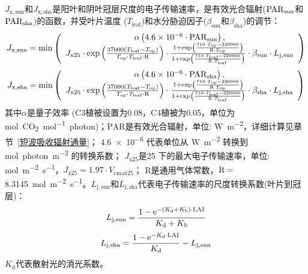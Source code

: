 $J_{\mathrm{x,sun}}$和$J_{\mathrm{x,sha}}$是阳叶和阴叶冠层尺度的电子传输速率，是有效光合辐射(${\rm PAR}_{\mathrm{sun}}$和${\rm PAR}_{\mathrm{sha}}$)的函数，并受叶片温度 ($T_{\mathrm{leaf}}$)和水分胁迫因子($\beta_{\mathrm{sun}}$和$\beta_{\mathrm{sha}}$)的调节：
\begin{equation}
\begin{aligned}
J_{\mathrm{x,sun}}=\min \left(\begin{array}{c} \alpha\left(4.6 \times 10^{-6} \cdot {\rm PAR}_{\mathrm{sun}}\right), \\
  J_{\mathrm{x25}} \cdot \exp\left(\frac{37000\left(T_{\mathrm{{leaf }}}-T_{\mathrm{o p}}\right)}{T_{\mathrm{o p}} \cdot T_{\mathrm{{leaf }}} \cdot {\rm R} } \right ) \cdot\frac{1+\exp\left(\frac{710 \cdot T_{\mathrm{o p}}-220000} {{\rm R} \cdot T_{\mathrm{o p}}}\right)}  {1+\exp\left(\frac{710 \cdot T_{\mathrm{leaf}}-220000} {{\rm R} \cdot T_{\mathrm{{leaf}}}}\right)} \cdot \beta_{\mathrm{sun}} \cdot L_{\mathrm{j,sun}}  \end{array} \right)
\end{aligned}
\end{equation}
\begin{equation}
\begin{aligned}
J_{\mathrm{x,sha}}=\min \left(\begin{array}{c} \alpha\left(4.6 \times 10^{-6} \cdot {\rm PAR}_{\mathrm{sha}}\right), \\
  J_{\mathrm{x25}} \cdot \exp\left(\frac{37000\left(T_{\mathrm{{leaf }}}-T_{\mathrm{o p}}\right)}{T_{\mathrm{o p}} \cdot T_{\mathrm{{leaf }}} \cdot {\rm R} } \right ) \cdot\frac{1+\exp\left(\frac{710 \cdot T_{\mathrm{o p}}-220000} {{\rm R} \cdot T_{\mathrm{o p}}}\right)}  {1+\exp\left(\frac{710 \cdot T_{\mathrm{leaf}}-220000} {{\rm R} \cdot T_{\mathrm{{leaf}}}}\right)} \cdot \beta_{\mathrm{sha}} \cdot L_{\mathrm{j,sha}}  \end{array} \right)
\end{aligned}
\end{equation}
其中$\alpha$是量子效率 (C3植被设置为0.08，C4植被为0.05，单位为\unit{mol.CO_2.mol^{-1}.photon})；${\mathrm {PAR}}$是有效光合辐射，单位: \unit{W.m^{-2}}，详细计算见章节~\ref{短波吸收辐射通量}；
\num{4.6e-6} 代表单位从 \unit{W.m^{-2}} 转换到 \unit{mol.photon.m^{-2}} 的转换系数；
$J_{\mathrm{x25}}$是25 \textcelsius 下的最大电子传输速率，单位: \unit{mol.m^{-2}.s^{-1}}，$J_{\mathrm{x25}}=1.97 \cdot V_{\mathrm{cmax 25}}$；
R是通用气体常数，${\rm R}=$ \qty{8.3145}{mol.m^{-2}.s^{-1}}。$L_{\mathrm{j,sun}}$和$L_{\mathrm{j,sha}}$代表电子传输速率的尺度转换系数(叶片到冠层)：
%
\begin{equation}\label{L_jsun}
L_{\mathrm{j,sun}}=\frac{1-{\mathrm e}^{-\left(K_{\mathrm{d}}+K_{\mathrm{b}}\right) \cdot {\rm LAI}}}{K_{\mathrm{d}}+K_{\mathrm{b}}}
\end{equation}
\begin{equation}\label{L_jsha}
L_{\mathrm{j,sha}}=\frac{1-{\mathrm e}^{-K_{\mathrm{d}}\cdot {\rm LAI}}}{K_{\mathrm{d}}} - L_{\mathrm{j,sun}}
\end{equation}
$K_{\mathrm{d}}$代表散射光的消光系数。

